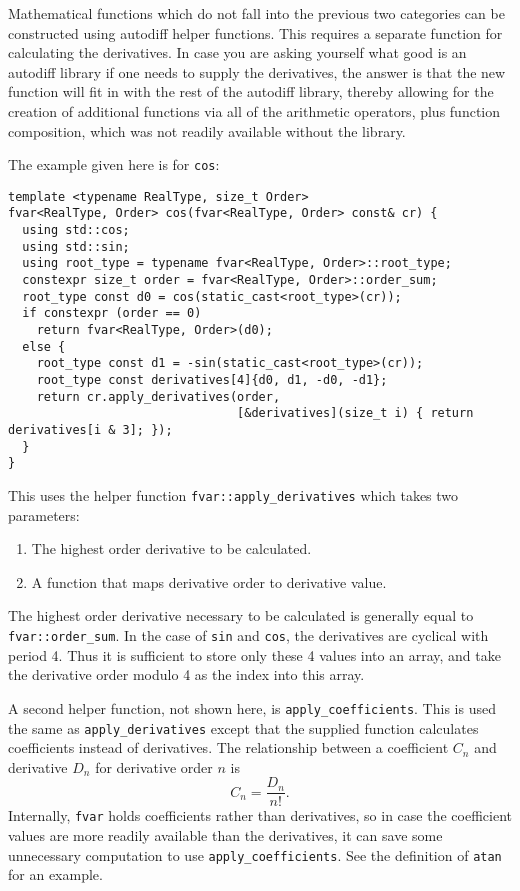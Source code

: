 \documentclass{article}
\begin{document}
Mathematical functions which do not fall into the previous two categories can be constructed using autodiff helper
functions. This requires a separate function for calculating the derivatives. In case you are asking yourself what
good is an autodiff library if one needs to supply the derivatives, the answer is that the new function will fit
in with the rest of the autodiff library, thereby allowing for the creation of additional functions via all of
the arithmetic operators, plus function composition, which was not readily available without the library.

The example given here is for {\tt cos}:
\begin{Verbatim}[xleftmargin=2em]
template <typename RealType, size_t Order>
fvar<RealType, Order> cos(fvar<RealType, Order> const& cr) {
  using std::cos;
  using std::sin;
  using root_type = typename fvar<RealType, Order>::root_type;
  constexpr size_t order = fvar<RealType, Order>::order_sum;
  root_type const d0 = cos(static_cast<root_type>(cr));
  if constexpr (order == 0)
    return fvar<RealType, Order>(d0);
  else {
    root_type const d1 = -sin(static_cast<root_type>(cr));
    root_type const derivatives[4]{d0, d1, -d0, -d1};
    return cr.apply_derivatives(order,
                                [&derivatives](size_t i) { return derivatives[i & 3]; });
  }
}
\end{Verbatim}
This uses the helper function {\tt fvar::apply\_derivatives} which takes two parameters:
\begin{enumerate}
\item The highest order derivative to be calculated.
\item A function that maps derivative order to derivative value.
\end{enumerate}
The highest order derivative necessary to be calculated is generally equal to {\tt fvar::order\_sum}.  In the case
of {\tt sin} and {\tt cos}, the derivatives are cyclical with period 4. Thus it is sufficient to store only these
4 values into an array, and take the derivative order modulo 4 as the index into this array.

A second helper function, not shown here, is {\tt apply\_coefficients}. This is used the same as
{\tt apply\_derivatives} except that the supplied function calculates coefficients instead of derivatives.
The relationship between a coefficient $C_n$ and derivative $D_n$ for derivative order $n$ is
\[
C_n = \frac{D_n}{n!}.
\]
Internally, {\tt fvar} holds coefficients rather than derivatives, so in case the coefficient values are more readily
available than the derivatives, it can save some unnecessary computation to use {\tt apply\_coefficients}.
See the definition of {\tt atan} for an example.
\end{document}
